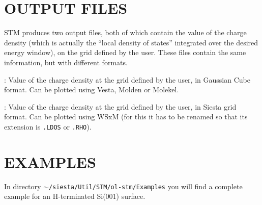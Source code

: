 \section{OUTPUT FILES}
\label{cap:output} 

{\sc STM} produces two output files, both of which contain the value
of the charge density (which is actually the ``local density of
states'' integrated over the desired energy window), on the grid
defined by the user.  These files contain the same information, but
with different formats.

\begin{description}
\itemsep 10pt
\parsep 0pt

\item[{\bf {\it SystemLabel}.STM.cube}]:
Value of the charge density at the grid defined by the user,
in Gaussian Cube format. Can be plotted using {\sc Vesta}, {\sc Molden}
or {\sc Molekel}.

\item[{\bf {\it SystemLabel}.STM.siesta}]:
Value of the charge density at the grid defined by the user,
in {\sc Siesta} grid format. Can be plotted using WSxM (for this it
has to be renamed so that its extension is {\tt .LDOS} or {\tt .RHO}).

\end{description}



\section{EXAMPLES}

In directory {\tt $\sim$/siesta/Util/STM/ol-stm/Examples} you will
find a complete example for an H-terminated Si(001) surface.



